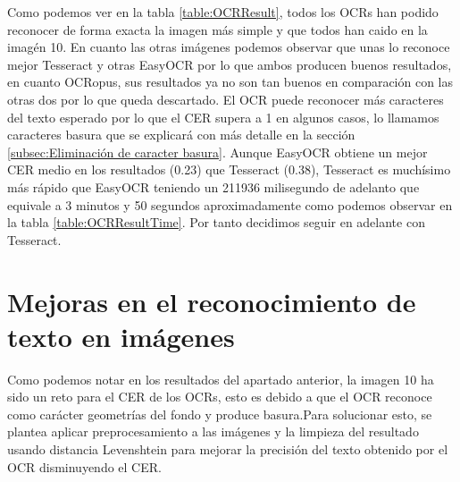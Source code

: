 Como podemos ver en la tabla \ref{table:OCRResult}, todos los OCRs han podido reconocer de forma exacta la imagen más simple y que todos han caido en la imagén 10. En cuanto las otras imágenes podemos observar que unas lo reconoce mejor Tesseract y otras EasyOCR por lo que ambos producen buenos resultados, en cuanto OCRopus, sus resultados ya no son tan buenos en comparación con las otras dos por lo que queda descartado. El OCR puede reconocer más caracteres del texto esperado por lo que el CER supera a 1 en algunos casos, lo llamamos caracteres basura que se explicará con más detalle en la sección \ref{subsec:Eliminación de caracter basura}. Aunque EasyOCR obtiene un mejor CER medio en los resultados (0.23) que Tesseract (0.38), Tesseract es muchísimo más rápido que EasyOCR teniendo un 211936 milisegundo de adelanto que equivale a 3 minutos y 50 segundos aproximadamente como podemos observar en la tabla \ref{table:OCRResultTime}. Por tanto decidimos seguir en adelante con Tesseract.



\section{Mejoras en el reconocimiento de texto en imágenes}
\label{sec:Mejoras en el reconocimiento}
Como podemos notar en los resultados del apartado anterior, la imagen 10 ha sido un reto para el CER de los OCRs, esto es debido a que el OCR reconoce como carácter geometrías del fondo y produce basura.Para solucionar esto, se plantea aplicar preprocesamiento a las imágenes y la limpieza del resultado usando distancia Levenshtein para mejorar la precisión del texto obtenido por el OCR disminuyendo el CER.

